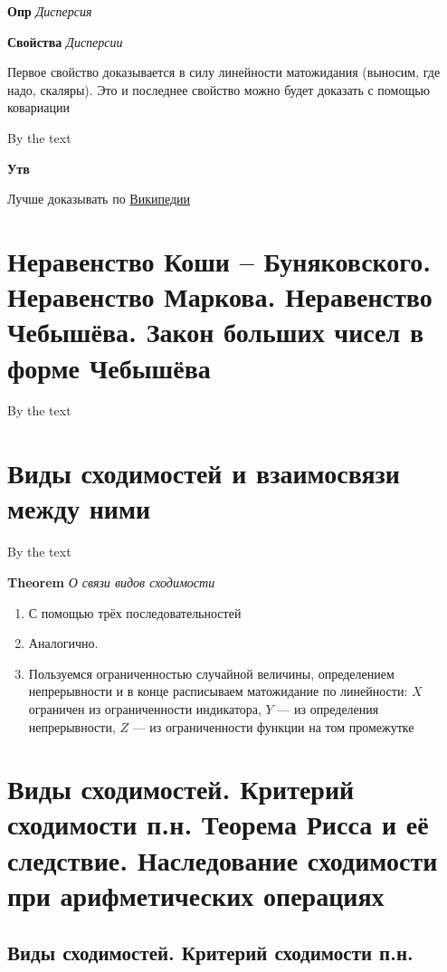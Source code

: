 \documentclass[a4paper, 14pt]{article}
\begin{document}
    \textbf{Опр} \textit{Дисперсия}
    
    \textbf{Свойства} \textit{Дисперсии}
    
    Первое свойство доказывается в силу линейности матожидания (выносим, где надо, скаляры).
    Это и последнее свойство можно будет доказать с помощью ковариации
    
    By the text
    
    \textbf{Утв}
    
    Лучше доказывать по \href{https://ru.wikipedia.org/wiki/Корреляция}{Википедии}
    
    \section{Неравенство Коши – Буняковского.
    Неравенство Маркова.
    Неравенство Чебышёва.
    Закон больших чисел в форме Чебышёва}
    
    By the text
    
    \section{Виды сходимостей и взаимосвязи между ними}
    
    By the text
    
    \textbf{Theorem} \textit{О связи видов сходимости}
    
    \begin{enumerate}
        \item С помощью трёх последовательностей
        \item Аналогично.
        \item Пользуемся ограниченностью случайной величины, определением непрерывности и в конце расписываем
        матожидание по линейности: $X$ ограничен из ограниченности индикатора, $Y$ --- из определения непрерывности,
        $Z$ --- из ограниченности функции на том промежутке
    \end{enumerate}
    
    \section{Виды сходимостей. Критерий сходимости п.н.
    Теорема Рисса и её следствие.
    Наследование сходимости при арифметических операциях}
    
    \subsection{Виды сходимостей. Критерий сходимости п.н.}
    
\end{document}
